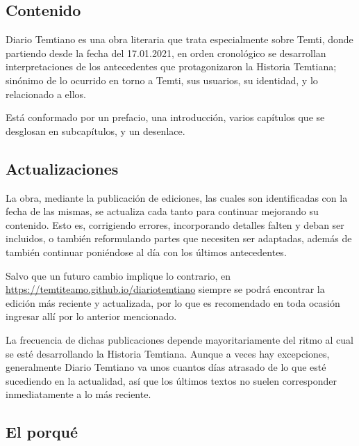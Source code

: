 \documentclass[
  spanish,
]{book}
\begin{document}
\hypertarget{contenido}{%
\subsection*{Contenido}\label{contenido}}

Diario Temtiano es una obra literaria que trata especialmente sobre Temti, donde partiendo desde la fecha del 17.01.2021, en orden cronológico se desarrollan interpretaciones de los antecedentes que protagonizaron la Historia Temtiana; sinónimo de lo ocurrido en torno a Temti, sus usuarios, su identidad, y lo relacionado a ellos.

Está conformado por un prefacio, una introducción, varios capítulos que se desglosan en subcapítulos, y un desenlace.

\hypertarget{actualizaciones}{%
\subsection*{Actualizaciones}\label{actualizaciones}}

La obra, mediante la publicación de ediciones, las cuales son identificadas con la fecha de las mismas, se actualiza cada tanto para continuar mejorando su contenido. Esto es, corrigiendo errores, incorporando detalles falten y deban ser incluidos, o también reformulando partes que necesiten ser adaptadas, además de también continuar poniéndose al día con los últimos antecedentes.

Salvo que un futuro cambio implique lo contrario, en \url{https://temtiteamo.github.io/diariotemtiano} siempre se podrá encontrar la edición más reciente y actualizada, por lo que es recomendado en toda ocasión ingresar allí por lo anterior mencionado.

La frecuencia de dichas publicaciones depende mayoritariamente del ritmo al cual se esté desarrollando la Historia Temtiana. Aunque a veces hay excepciones, generalmente Diario Temtiano va unos cuantos días atrasado de lo que esté sucediendo en la actualidad, así que los últimos textos no suelen corresponder inmediatamente a lo más reciente.

\hypertarget{el-porquuxe9}{%
\subsection*{El porqué}\label{el-porquuxe9}}
\end{document}
